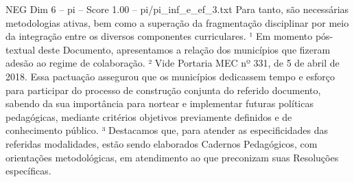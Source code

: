 \begin{textsample}{NEG Dim 6 – pi – Score 1.00 – pi/pi\_inf\_e\_ef\_3.txt}
Para tanto, são necessárias metodologias ativas, bem como a superação da fragmentação disciplinar por meio da integração entre os diversos componentes curriculares. ¹ Em momento pós-textual deste Documento, apresentamos a relação dos municípios que fizeram adesão ao regime de colaboração. ² Vide Portaria MEC nº 331, de 5 de abril de 2018.
Essa pactuação assegurou que os municípios dedicassem tempo e esforço para participar do processo de construção conjunta do referido documento, sabendo da sua importância para nortear e implementar futuras políticas pedagógicas, mediante critérios objetivos previamente definidos e de conhecimento público. ³ Destacamos que, para atender as especificidades das referidas modalidades, estão sendo elaborados Cadernos Pedagógicos, com orientações metodológicas, em atendimento ao que preconizam suas Resoluções específicas.

\end{textsample}
